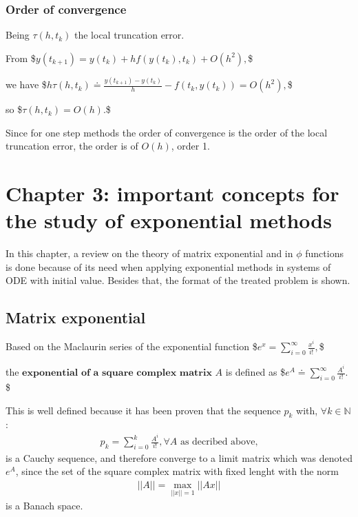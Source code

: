 \documentclass[letterpaper,10pt,english]{jupyterBook}
\begin{document}
\subsubsection{Order of convergence}
\label{\detokenize{cap2:order-of-convergence}}
\sphinxAtStartPar
Being \(\tau(h, t_k)\) the local truncation error.

\sphinxAtStartPar
From
\$\(
    y(t_{k+1}) = y(t_k) + h f(y(t_k),t_k) + O(h^2),
\)\$

\sphinxAtStartPar
we have
\$\(
    h \tau(h, t_k) \doteq \frac{y(t_{k+1}) - y(t_k)}{h} - f(t_k, y(t_k)) = O(h^2),
\)\$

\sphinxAtStartPar
so
\$\(
    \tau(h, t_k) = O(h).
\)\$

\sphinxAtStartPar
Since for one step methods the order of convergence is the order of the local truncation error, the order is of \(O(h)\), order 1.

\sphinxstepscope


\section{Chapter 3: important concepts for the study of exponential methods}
\label{\detokenize{cap3:chapter-3-important-concepts-for-the-study-of-exponential-methods}}\label{\detokenize{cap3::doc}}
\sphinxAtStartPar
In this chapter, a review on the theory of matrix exponential and in \(\phi\) functions is done because of its need when applying exponential methods in systems of ODE with initial value. Besides that, the format of the treated problem is shown.


\subsection{Matrix exponential}
\label{\detokenize{cap3:matrix-exponential}}
\sphinxAtStartPar
Based on the Maclaurin series of the exponential function
\$\(
    e^x = \sum_{i=0}^{\infty} \frac{x^i}{i!},
\)\$

\sphinxAtStartPar
the \(\textbf{exponential of a square complex matrix }A\) is defined as
\$\(
    e^A \doteq \sum_{i=0}^{\infty} \frac{A^i}{i!}.
\)\$

\sphinxAtStartPar
This is well defined because it has been proven that the sequence \({p_k}\) with, \(\forall k \in \mathbb{N}\):
\begin{equation*}
\begin{split}
    p_k = \sum_{i=0}^{k} \frac{A^i}{i!}, \forall A \text{ as decribed above,}
\end{split}
\end{equation*}
\sphinxAtStartPar
is a Cauchy sequence, and therefore converge to a limit matrix which was denoted \(e^A\), since the set of the square complex matrix with fixed lenght with the norm
\begin{equation*}
\begin{split}
||A|| = \max_{||x||=1} ||Ax||
\end{split}
\end{equation*}
\sphinxAtStartPar
is a Banach space.
\end{document}
